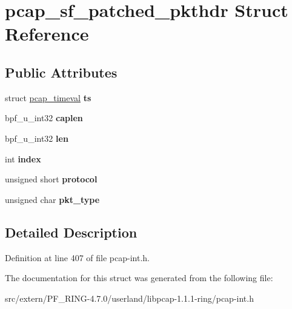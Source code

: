 \hypertarget{structpcap__sf__patched__pkthdr}{
\section{pcap\_\-sf\_\-patched\_\-pkthdr Struct Reference}
\label{structpcap__sf__patched__pkthdr}
}
\subsection*{Public Attributes}
\begin{DoxyCompactItemize}
\item 
\hypertarget{structpcap__sf__patched__pkthdr_a03c84e8e4086186081732a4ac1de84ca}{
struct \hyperlink{structpcap__timeval}{pcap\_\-timeval} {\bfseries ts}}
\label{structpcap__sf__patched__pkthdr_a03c84e8e4086186081732a4ac1de84ca}

\item 
\hypertarget{structpcap__sf__patched__pkthdr_af598266f27b321b60a28c3c0ce443f0a}{
bpf\_\-u\_\-int32 {\bfseries caplen}}
\label{structpcap__sf__patched__pkthdr_af598266f27b321b60a28c3c0ce443f0a}

\item 
\hypertarget{structpcap__sf__patched__pkthdr_a84dce3e32d41e17ff3af7b64e994a567}{
bpf\_\-u\_\-int32 {\bfseries len}}
\label{structpcap__sf__patched__pkthdr_a84dce3e32d41e17ff3af7b64e994a567}

\item 
\hypertarget{structpcap__sf__patched__pkthdr_ac1bba89ee72d53f567fb6d37eab6ed47}{
int {\bfseries index}}
\label{structpcap__sf__patched__pkthdr_ac1bba89ee72d53f567fb6d37eab6ed47}

\item 
\hypertarget{structpcap__sf__patched__pkthdr_af73c00992f76fa66c5350a241224d046}{
unsigned short {\bfseries protocol}}
\label{structpcap__sf__patched__pkthdr_af73c00992f76fa66c5350a241224d046}

\item 
\hypertarget{structpcap__sf__patched__pkthdr_a35e20a92a1568f65f6efdc66ac0aa67e}{
unsigned char {\bfseries pkt\_\-type}}
\label{structpcap__sf__patched__pkthdr_a35e20a92a1568f65f6efdc66ac0aa67e}

\end{DoxyCompactItemize}


\subsection{Detailed Description}


Definition at line 407 of file pcap-\/int.h.



The documentation for this struct was generated from the following file:\begin{DoxyCompactItemize}
\item 
src/extern/PF\_\-RING-\/4.7.0/userland/libpcap-\/1.1.1-\/ring/pcap-\/int.h\end{DoxyCompactItemize}
